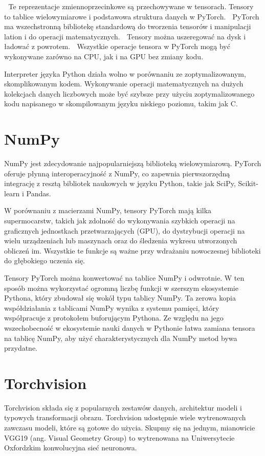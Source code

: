 \documentclass[brudnopis]{xmgr}
\begin{document}
􏰹 Te reprezentacje zmiennoprzecinkowe są przechowywane w tensorach.
Tensory to tablice wielowymiarowe i podstawowa struktura danych w PyTorch.
􏰹 PyTorch ma wszechstronną bibliotekę standardową do tworzenia tensorów i manipulacji
lation i do operacji matematycznych.
􏰹 Tensory można uszeregować na dysk i ładować z powrotem.
􏰹 Wszystkie operacje tensora w PyTorch mogą być wykonywane zarówno na CPU, jak i na GPU
bez zmiany kodu.

Interpreter języka Python działa wolno w porównaniu ze zoptymalizowanym, skomplikowanym kodem. Wykonywanie operacji matematycznych na dużych kolekcjach danych liczbowych może być szybsze przy użyciu zoptymalizowanego kodu napisanego w skompilowanym języku niskiego poziomu, takim jak C.

    \section{NumPy\label{s:dsssl}}
    
    NumPy jest zdecydowanie najpopularniejszą biblioteką wielowymiarową. PyTorch oferuje płynną interoperacyjność z NumPy, co zapewnia pierwszorzędną integrację z resztą bibliotek naukowych w języku Python, takie jak SciPy, Scikit-learn i Pandas.

W porównaniu z macierzami NumPy, tensory PyTorch mają kilka supermocarstw, takich jak zdolność do wykonywania szybkich operacji na graficznych jednostkach przetwarzających (GPU), do dystrybucji operacji na wielu urządzeniach lub maszynach oraz do śledzenia wykresu utworzonych obliczeń im. Wszystkie te funkcje są ważne przy wdrażaniu nowoczesnej biblioteki do głębokiego uczenia się.


Tensory PyTorch można konwertować na tablice NumPy i odwrotnie. W ten sposób można wykorzystać ogromną liczbę funkcji w szerszym ekosystemie Pythona, który zbudował się wokół typu tablicy NumPy. Ta zerowa kopia współdziałania z tablicami NumPy wynika z systemu pamięci, który współpracuje z protokołem buforującym Pythona. 
Ze względu na jego wszechobecność w ekosystemie nauki danych w Pythonie łatwa zamiana tensora na tablicę NumPy, aby użyć charakterystycznych dla NumPy metod bywa przydatne.

    \section{Torchvision\label{s:dsssl}}
    
    Torchvision składa się z popularnych zestawów danych, architektur modeli i typowych transformacji obrazu. Torchvision udostępnie wiele wytrenowanych zawczasu modeli, które są gotowe do użycia. Skupmy się na jednym, mianowicie VGG19 (ang. Visual Geometry Group) to wytrenowana na Uniwersytecie Oxfordzkim  konwolucyjna sieć neuronowa.
\end{document}
